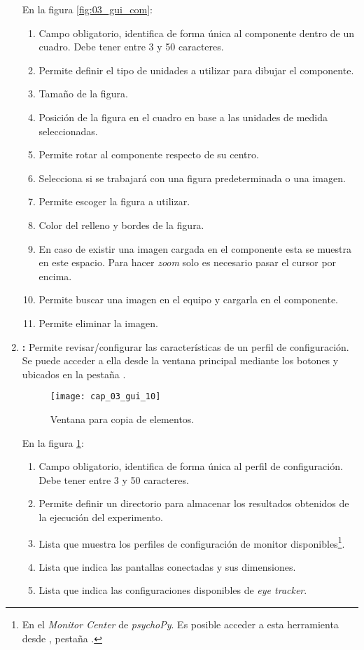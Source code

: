 \documentclass[\main/Main.tex]{subfiles}
\begin{document}
\begin{enumerate}
				En la figura \ref{fig:03_gui_com}:
				\begin{enumerate}[(1)]\setlength\itemsep{-0.5em}
					\item Campo obligatorio, identifica de forma única al componente dentro de un cuadro. Debe tener entre 3 y 50 caracteres.
					\item Permite definir el tipo de unidades a utilizar para dibujar el componente.
					\item Tamaño de la figura.
					\item Posición de la figura en el cuadro en base a las unidades de medida seleccionadas.
					\item Permite rotar al componente respecto de su centro.
					\item Selecciona si se trabajará con una figura predeterminada o una imagen.
					\item Permite escoger la figura a utilizar.
					\item Color del relleno y bordes de la figura.
					\item En caso de existir una imagen cargada en el componente esta se muestra en este espacio. Para hacer \textit{zoom} solo es necesario pasar el cursor por encima.
					\item Permite buscar una imagen en el equipo y cargarla en el componente.
					\item Permite eliminar la imagen.
				\end{enumerate}

				\item \textbf{:} Permite revisar/configurar las características de un perfil de configuración. Se puede acceder a ella desde la ventana principal mediante los botones  y  ubicados en la pestaña .
				\begin{figure}[H]
					\centering
					\texttt{[image: cap\_03\_gui\_10]}
					\caption{Ventana para copia de elementos.}
					\label{fig:03_gui_con}
				\end{figure}

				\vspace{-5mm}

				En la figura \ref{fig:03_gui_con}:
				\begin{enumerate}[(1)]\setlength\itemsep{-0.5em}
					\item Campo obligatorio, identifica de forma única al perfil de configuración. Debe tener entre 3 y 50 caracteres.
					\item Permite definir un directorio para almacenar los resultados obtenidos de la ejecución del experimento.
					\item Lista que muestra los perfiles de configuración de monitor disponibles\footnote{En el \textit{Monitor Center} de \textit{psychoPy}. Es posible acceder a esta herramienta desde , pestaña .}.
					\item Lista que indica las pantallas conectadas y sus dimensiones.
					\item Lista que indica las configuraciones disponibles de \textit{eye tracker}.
				\end{enumerate}


\end{enumerate}
\end{document}
